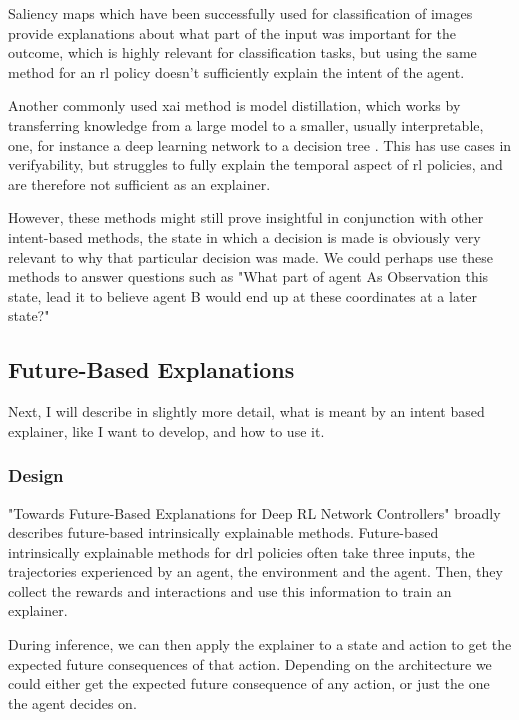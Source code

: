 \documentclass[UKenglish]{uiomasterthesis}
\begin{document}
Saliency maps which have been successfully used for classification of images provide explanations about what part of the input was important for the outcome, which is highly relevant for classification tasks, but using the same method for an \ac{rl} policy doesn't sufficiently explain the intent of the agent\cite{atrey2020exploratory}.

Another commonly used \ac{xai} method is model distillation, which works by transferring knowledge from a large model to a smaller, usually interpretable, one, for instance a deep learning network to a decision tree \cite{bastani2019verifiable}. This has use cases in verifyability, but struggles to fully explain the temporal aspect of \ac{rl} policies, and are therefore not sufficient as an explainer.

However, these methods might still prove insightful in conjunction with other intent-based methods, the state in which a decision is made is obviously very relevant to why that particular decision was made. We could perhaps use these methods to answer questions such as "What part of agent As Observation this state, lead it to believe agent B would end up at these coordinates at a later state?"
\medskip

\subsection{Future-Based Explanations}
Next, I will describe in slightly more detail, what is meant by an intent based explainer, like I want to develop, and how to use it.

\subsubsection{Design}
"Towards Future-Based Explanations for Deep RL Network Controllers"\cite{10.1145/3626570.3626607} broadly describes future-based intrinsically explainable methods. Future-based intrinsically explainable methods for \ac{drl} policies often take three inputs, the trajectories experienced by an agent, the environment and the agent. Then, they collect the rewards and interactions and use this information to train an explainer.

During inference, we can then apply the explainer to a state and action to get the expected future consequences of that action. Depending on the architecture we could either get the expected future consequence of any action, or just the one the agent decides on.
\end{document}
